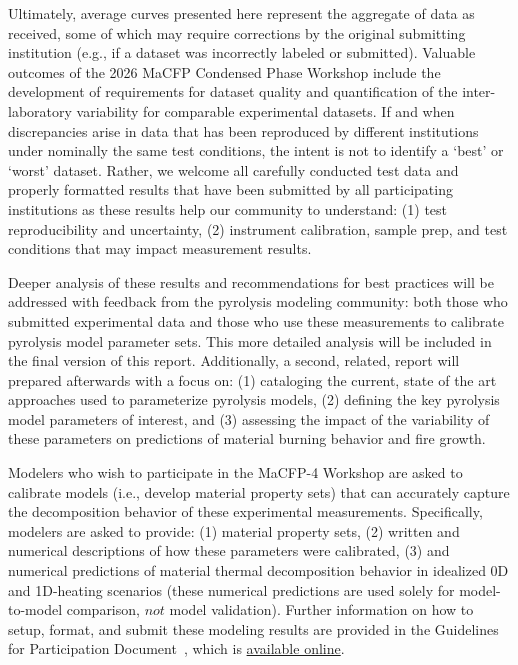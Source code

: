 \documentclass{book}
\begin{document}
Ultimately, average curves presented here represent the aggregate of data as received, some of which may require corrections by the original submitting institution (e.g., if a dataset was incorrectly labeled or submitted). Valuable outcomes of the 2026 MaCFP Condensed Phase Workshop include the development of requirements for dataset quality and quantification of the inter-laboratory variability for comparable experimental datasets. If and when discrepancies arise in data that has been reproduced by different institutions under nominally the same test conditions, the intent is not to identify a `best' or `worst' dataset. Rather, we welcome all carefully conducted test data and properly formatted results that have been submitted by all participating institutions as these results help our community to understand: (1) test reproducibility and uncertainty, (2) instrument calibration, sample prep, and test conditions that may impact measurement results.

Deeper analysis of these results and recommendations for best practices will be addressed with feedback from the pyrolysis modeling community: both those who submitted experimental data and those who use these measurements to calibrate pyrolysis model parameter sets. This more detailed analysis will be included in the final version of this report. Additionally, a second, related, report will prepared afterwards with a focus on: (1) cataloging the current, state of the art approaches used to parameterize pyrolysis models, (2) defining the key pyrolysis model parameters of interest, and (3) assessing the impact of the variability of these parameters on predictions of material burning behavior and fire growth.

Modelers who wish to participate in the MaCFP-4 Workshop are asked to calibrate models (i.e., develop material property sets) that can accurately capture the decomposition behavior of these experimental measurements. Specifically, modelers are asked to provide: (1) material property sets,  (2) written and numerical descriptions of how these parameters were calibrated, (3) and numerical predictions of material thermal decomposition behavior in idealized 0D and 1D-heating scenarios (these numerical predictions are used solely for model-to-model comparison, $not$ model validation).  Further information on how to setup, format, and submit these modeling results are provided in the Guidelines for Participation Document~\cite{MaCFP4Guidelines}, which is \href{https://github.com/MaCFP/macfp-db/releases/tag/macfp-4.0}{available online}.



%
%
\appendix

\end{document}
